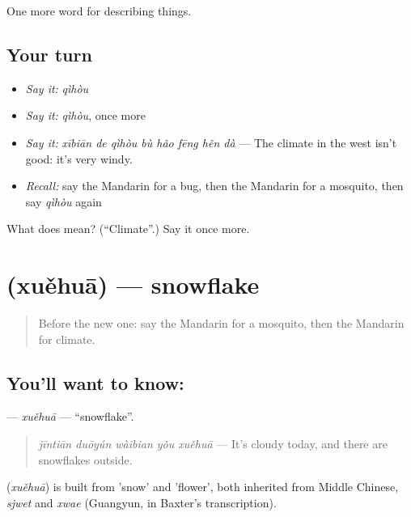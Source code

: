 \begin{grammarlens}[title={What you've built}]
One more word for describing things.
\end{grammarlens}

\subsection*{Your turn}
\begin{itemize}
\raggedright
  \item \emph{Say it:} \emph{qìhòu}
  \item \emph{Say it:} \emph{qìhòu}, once more
  \item \emph{Say it:} \emph{xībiān de qìhòu bù hǎo fēng hěn dà} — The climate in the west isn't good: it's very windy.
  \item \emph{Recall:} say the Mandarin for a bug, then the Mandarin for a mosquito, then say \emph{qìhòu} again
\end{itemize}

\begin{tcolorbox}[breakable,colback=teal!4,colframe=teal!35!black,title={Before you move on}]
What does  mean? (\textquotedblleft{}Climate\textquotedblright{}.) Say it once more.
\end{tcolorbox}
\section[\texorpdfstring{\zh{雪花} (xuěhuā)}{雪花 (xuěhuā)}]{ (xuěhuā) — snowflake}

\label{lesson:ZH-C243-xuehua}



\begin{quote}
Before the new one: say the Mandarin for a mosquito, then the Mandarin for climate.
\end{quote}

\subsection*{You'll want to know: }
\textbf{} — \emph{xuěhuā} — \textquotedblleft{}snowflake\textquotedblright{}.

\begin{quote}
\textbf{} \emph{jīntiān duōyún wàibian yǒu xuěhuā} — It's cloudy today, and there are snowflakes outside.
\end{quote}

\begin{cousinweb}
\textbf{} (\emph{xuěhuā}) is built from  'snow' and  'flower', both inherited from Middle Chinese, \emph{sjwet} and \emph{xwae} (Guangyun, in Baxter's transcription).
\end{cousinweb}

